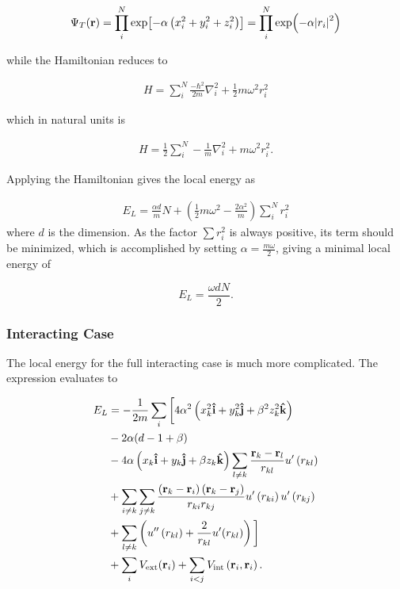 \newcommand{\psit}{\Psi_T(\vb{r})}
\newcommand{\onebody}{\prod_{i}^{N}\exp{-\alpha\left[\left( x_i^2 + y_i^2 + \beta
		z_i^2\right)\right]}}
\begin{align*}
\psit = \prod_{i}^{N}\exp[-\alpha\left( x_{i}^{2}+y_{i}^{2}+z_{i}^{2} \right)] = \prod_{i}^{N}\exp(-\alpha \abs{r_{i}}^{2})
\end{align*}

while the Hamiltonian reduces to

\begin{align*}
H = \sum_{i}^{N} \frac{-\hbar^{2}}{2m}\nabla_{i}^{2} + \frac{1}{2}m\omega^{2}r_{i}^{2}
\end{align*}

which in natural units is

\newcommand{\lapl}[1]{\nabla_{#1}^2}
\begin{align*}
H = \frac{1}{2}\sum_{i}^{N} -\frac{1}{m}\lapl{i} + m\omega^{2}r_{i}^{2}.
\end{align*}

Applying the Hamiltonian gives the local energy as

\begin{align*}
E_{L} = \frac{\alpha d}{m} N + \left( \frac{1}{2}m\omega^{2} - \frac{2\alpha^{2}}{m} \right)\sum_{i}^{N}r_{i}^{2}
\end{align*}
where \(d\) is the dimension. As the factor \(\sum r_{i}^{2}\) is always
positive, its term should be minimized, which is accomplished by setting
\(\alpha = \frac{m\omega}{2}\), giving a minimal local energy of

\begin{equation}
E_{L} = \frac{\omega d N}{2}.
\label{eq:noninteracting}
\end{equation}

\subsubsection{Interacting Case}
The local energy for the full interacting case is much more complicated. The expression
evaluates to

\begin{align*}
E_{L} &= -\frac{1}{2m}\sum_{i}\bigg[4\alpha^{2}\left(  x_{k}^{2}\uvec{i} + y_{k}^{2}\uvec{j} + \beta^{2} z_{k}^{2}\uvec{k}  \right)\\
&-2\alpha(d-1+\beta)\\
&- 4\alpha\left(  x_{k}\uvec{i} + y_{k}\uvec{j} + \beta z_{k}\uvec{k}  \right)
\sum_{l\neq k} \frac{\vb{r}_{k}-\vb{r}_{l}}{r_{kl}}u^{\prime}\left( r_{kl} \right)\\
&+ \sum_{i\neq k}\sum_{j\neq k}\frac{\left( \vb{r}_{k}-\vb{r}_{i} \right)\left( \vb{r}_{k} -\vb{r}_{j} \right)}{r_{ki}r_{kj}}u^{\prime}\left( r_{ki} \right)u^{\prime}\left( r_{kj} \right)\\
&+ \sum_{l\neq k} \left( u^{\prime\prime}\left( r_{kl} \right)  + \frac{2}{r_{kl}}u^{\prime}(r_{kl})\right)\bigg]\\
&+ \sum_{i}V_{\text{ext}}(\vb{r}_{i}) + \sum_{i<j}V_{\text{int}}\left( \vb{r}_{i}, \vb{r}_{i} \right).
\end{align*}

